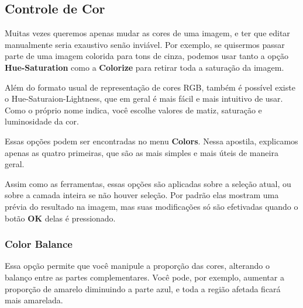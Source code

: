 \documentclass[12pt,onecolumn]{article}
\begin{document}
  \subsection{Controle de Cor}
  \label{sec:color_control}
  
    Muitas vezes queremos apenas mudar as cores de uma imagem, e ter que editar
    manualmente seria exaustivo senão inviável. Por exemplo, se quisermos passar
    parte de uma imagem colorida para tons de cinza, podemos usar tanto a opção
    {\bf Hue-Saturation} como a {\bf Colorize} para retirar toda a saturação da
    imagem.
    
    \begin{framed}
      Além do formato usual de representação de cores RGB, também é possível
      existe o Hue-Saturaion-Lightness, que em geral é mais fácil e mais
      intuitivo de usar. Como o próprio nome indica, você escolhe valores de
      matiz, saturação e luminosidade da cor.
    \end{framed}
    
    Essas opções podem ser encontradas no menu {\bf Colors}. Nessa apostila,
    explicamos apenas as quatro primeiras, que são as mais simples e mais úteis
    de maneira geral.
    
    Assim como as ferramentas, essas opções são aplicadas sobre a seleção atual,
    ou sobre a camada inteira se não houver seleção. Por padrão elas mostram uma
    prévia do resultado na imagem, mas suas modificações só são efetivadas quando
    o botão \textbf{OK} delas é pressionado.
    
      \subsubsection{Color Balance}
        Essa opção permite que você manipule a proporção das cores, alterando o
        balanço entre as partes complementares. Você pode, por exemplo, aumentar
        a proporção de amarelo diminuindo a parte azul, e toda a região afetada
        ficará mais amarelada.
      
\end{document}

